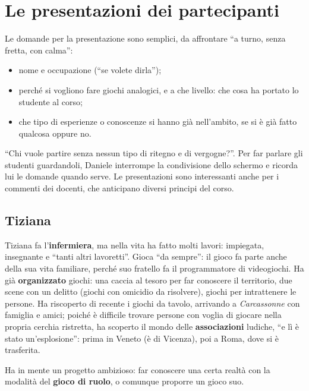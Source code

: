 \section{Le presentazioni dei partecipanti}
\label{a1:sec:partecipanti}

Le domande per la presentazione sono semplici, da affrontare ``a turno, senza
fretta, con calma'':
\begin{itemize}
  \item nome e occupazione (``se volete dirla'');
  \item perché si vogliono fare giochi analogici, e a che livello: che cosa ha
        portato lo studente al corso;
  \item che tipo di esperienze o conoscenze si hanno già nell'ambito, se si è già
        fatto qualcosa oppure no.
\end{itemize}
``Chi vuole partire senza nessun tipo di ritegno e di vergogne?''. Per far
parlare gli studenti guardandoli, Daniele interrompe la condivisione dello
schermo e ricorda lui le domande quando serve. Le presentazioni sono interessanti
anche per i commenti dei docenti, che anticipano diversi principi del corso.

\subsection{Tiziana}

Tiziana fa l'\textbf{infermiera}, ma nella vita ha fatto molti lavori:
impiegata, insegnante e ``tanti altri lavoretti''. Gioca ``da sempre'': il gioco
fa parte anche della sua vita familiare, perché suo fratello fa il programmatore
di videogiochi. Ha già \textbf{organizzato} giochi: una caccia al tesoro per far
conoscere il territorio, due scene con un delitto (giochi con omicidio da
risolvere), giochi per intrattenere le persone. Ha riscoperto di recente i giochi
da tavolo, arrivando a \emph{Carcassonne} con famiglia e amici; poiché è
difficile trovare persone con voglia di giocare nella propria cerchia ristretta,
ha scoperto il mondo delle \textbf{associazioni} ludiche, ``e lì è stato
un'esplosione'': prima in Veneto (è di Vicenza), poi a Roma, dove si è
trasferita.

Ha in mente un progetto ambizioso: far conoscere una certa realtà con la modalità
del \textbf{gioco di ruolo}, o comunque proporre un gioco suo.

